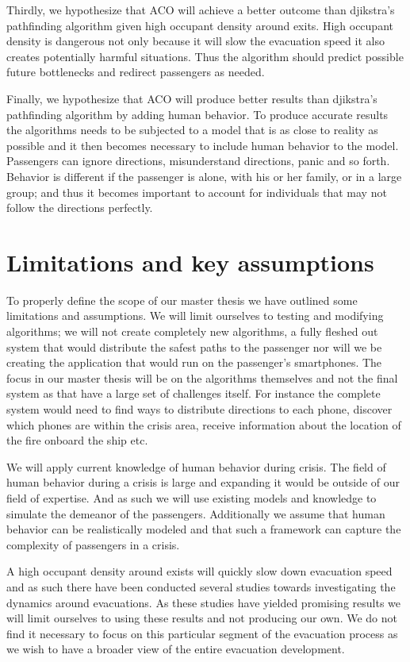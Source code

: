 Thirdly, we hypothesize that ACO will achieve a better outcome than djikstra's pathfinding algorithm
given high occupant density around exits. High occupant density is dangerous not only
because it will slow the evacuation speed it also creates potentially harmful situations. Thus the algorithm
should predict possible future bottlenecks and redirect passengers as needed.

Finally, we hypothesize that ACO will produce better results than djikstra's pathfinding algorithm
by adding human behavior. To produce accurate results the algorithms needs to be subjected
to a model that is as close to reality as possible and it then becomes necessary to include
human behavior to the model. Passengers can ignore directions, misunderstand directions, panic
and so forth. Behavior is different if the passenger is alone, with his or her family, or in a large group;
and thus it becomes important to account for individuals that may not follow the directions perfectly.

\section{Limitations and key assumptions}

To properly define the scope of our master thesis we have outlined
some limitations and assumptions. We will limit ourselves to testing and modifying algorithms;
we will not create completely new algorithms, a fully fleshed out system that would distribute the
safest paths to the passenger nor will we be creating the application that would run on the passenger's smartphones.
The focus in our master thesis will be on the algorithms themselves and not the final system as that have a large set
of challenges itself. For instance the complete system would need to find ways to distribute directions to each phone,
discover which phones are within the crisis area, receive information about the location of the fire onboard the ship etc.

We will apply current knowledge of human behavior during crisis. The field of human behavior during a crisis is large
and expanding it would be outside of our field of expertise. And as such we will use existing models and knowledge
to simulate the demeanor of the passengers. Additionally we assume that human behavior can be realistically modeled
and that such a framework can capture the complexity of passengers in a crisis.

A high occupant density around exists will quickly slow down evacuation speed and as such there have been conducted several studies
towards investigating the dynamics around evacuations. As these studies have yielded promising results we will
limit ourselves to using these results and not producing our own. We do not find it necessary to focus on this particular segment 
of the evacuation process as we wish to have a broader view of the entire evacuation development.

